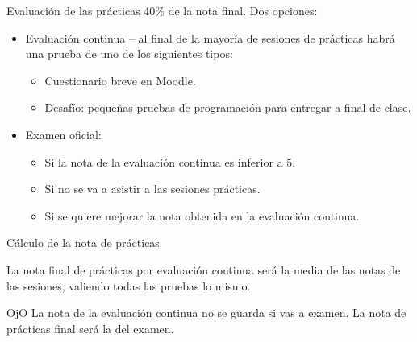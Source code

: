 \documentclass[usenames,dvipsnames,aspectratio=169]{beamer}
\begin{document}
\begin{frame}{Evaluación de las prácticas}
    40\% de la nota final.
    Dos opciones:
    \begin{itemize}
        \item Evaluación continua – al final de la mayoría de sesiones de prácticas habrá una prueba de uno de los siguientes tipos:
        \begin{itemize}
            \item Cuestionario breve en Moodle.
            \item Desafío: pequeñas pruebas de programación para entregar a final de clase.
        \end{itemize}
        \item Examen oficial: 
        \begin{itemize}
        	\item Si la nota de la evaluación continua es inferior a 5.
        	\item Si no se va a asistir a las sesiones prácticas.
        	\item Si se quiere mejorar la nota obtenida en la evaluación continua.
        \end{itemize}
    \end{itemize}
\end{frame}

\begin{frame}{Cálculo de la nota de prácticas}
	\begin{minipage}{.55\linewidth}
    	La nota final de prácticas por evaluación continua será la media de las notas de las sesiones, valiendo todas las pruebas lo mismo.
	\end{minipage}
	\hfill
	\begin{minipage}{.38\linewidth}
    	\begin{block}{OjO}
        	La nota de la evaluación continua no se guarda si vas a examen. La nota de prácticas final será la del examen.
    	\end{block}
	\end{minipage}
\end{frame}

\end{document}
